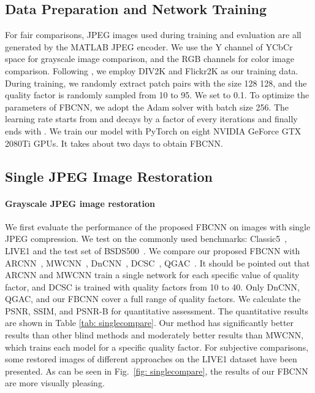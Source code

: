 \documentclass[10pt,twocolumn,letterpaper]{article}
\begin{document}
\subsection{Data Preparation and Network Training}
For fair comparisons, JPEG images used during training and evaluation are all generated by the MATLAB JPEG encoder. We use the Y channel of YCbCr space for grayscale image comparison, and the RGB channels for color image comparison. Following \cite{ehrlich2020quantization}, we employ DIV2K \cite{agustsson2017ntire} and Flickr2K \cite{timofte2017ntire} as our training data. During training, we randomly extract patch pairs with the size 128  128, and the quality factor is randomly sampled from 10 to 95. We set  to 0.1. To optimize the parameters of FBCNN, we adopt the Adam solver \cite{kingma2014adam} with batch size 256. The learning rate starts from  and decays by a factor of  every  iterations and finally ends with . We train our model with PyTorch on eight NVIDIA GeForce GTX 2080Ti GPUs. It takes about two days to obtain FBCNN.

\subsection{Single JPEG Image Restoration}
\paragraph{Grayscale JPEG image restoration} We first evaluate the performance of the proposed FBCNN on images with single JPEG compression. We test on the commonly used benchmarks: Classic5~\cite{zeyde2010single}, LIVE1 \cite{sheikh2005live} and the test set of BSDS500~\cite{martin2001database}. We compare our proposed FBCNN with ARCNN~\cite{dong2015compression}, MWCNN~\cite{Liu_2018_CVPR_Workshops}, DnCNN~\cite{zhang2017beyond}, DCSC~\cite{fu2019jpeg}, QGAC~\cite{ehrlich2020quantization}. It should be pointed out that ARCNN and MWCNN train a single network for each specific value of quality factor, and DCSC is trained with quality factors from 10 to 40. Only DnCNN, QGAC, and our FBCNN cover a full range of quality factors. We calculate the PSNR, SSIM, and PSNR-B for quantitative assessment. The quantitative results are shown in Table \ref{tab: singlecompare}. Our method has significantly better results than other blind methods and moderately better results than MWCNN, which trains each model for a specific quality factor. For subjective comparisons, some restored images of different approaches on the LIVE1 dataset have been presented. As can be seen in Fig.~\ref{fig: singlecompare}, the results of our FBCNN are more visually pleasing.
\end{document}

